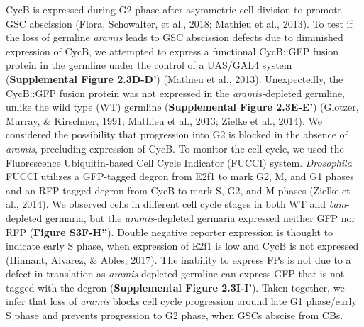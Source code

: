\documentclass[12pt,twoside]{reedthesis}
\begin{document}
CycB is expressed during G2 phase after asymmetric cell division to
promote GSC abscission (Flora, Schowalter, et al., 2018; Mathieu et al., 2013). To test if the
loss of germline \emph{aramis} leads to GSC abscission defects due to
diminished expression of CycB, we attempted to express a functional
CycB::GFP fusion protein in the germline under the control of a UAS/GAL4
system (\textbf{Supplemental Figure 2.3D-D'}) (Mathieu et al., 2013). Unexpectedly, the
CycB::GFP fusion protein was not expressed in the \emph{aramis-}depleted
germline, unlike the wild type (WT) germline (\textbf{Supplemental Figure 2.3E-E'})
(Glotzer, Murray, \& Kirschner, 1991; Mathieu et al., 2013; Zielke et al., 2014).
We considered the possibility that progression into G2 is blocked in the
absence of \emph{aramis}, precluding expression of CycB. To monitor the cell
cycle, we used the Fluorescence Ubiquitin-based Cell Cycle Indicator
(FUCCI) system. \emph{Drosophila} FUCCI utilizes a GFP-tagged degron from
E2f1 to mark G2, M, and G1 phases and an RFP-tagged degron from CycB to
mark S, G2, and M phases (Zielke et al., 2014). We observed cells in
different cell cycle stages in both WT and \emph{bam}-depleted germaria, but
the \emph{aramis}-depleted germaria expressed neither GFP nor RFP (\textbf{Figure
S3F-H''}). Double negative reporter expression is thought to indicate
early S phase, when expression of E2f1 is low and CycB is not expressed
(Hinnant, Alvarez, \& Ables, 2017). The inability to express FPs is
not due to a defect in translation as \emph{aramis}-depleted germline can
express GFP that is not tagged with the degron (\textbf{Supplemental Figure 2.3I-I'}).
Taken together, we infer that loss of \emph{aramis} blocks cell cycle
progression around late G1 phase/early S phase and prevents progression
to G2 phase, when GSCs abscise from CBs.
\end{document}
